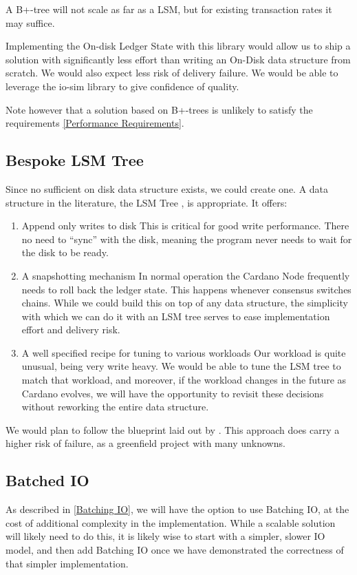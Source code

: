 \documentclass[11pt,a4paper]{article}
\begin{document}
A B+-tree will not scale as far as a LSM, but for existing transaction rates it
may suffice.

Implementing the On-disk Ledger State with this library would allow us to ship a
solution with significantly less effort than writing an On-Disk data structure
from scratch. We would also expect less risk of delivery failure. We would be
able to leverage the io-sim library to give confidence of quality.

Note however that a solution based on B+-trees is unlikely to satisfy the requirements \ref{Performance Requirements}.

\subsection{Bespoke LSM Tree}

Since no sufficient on disk data structure exists, we could create one. A data
structure in the literature, the LSM Tree \cite{monkey}, is appropriate. It offers:

\begin{enumerate}
  \item Append only writes to disk
        This is critical for good write performance. There no need to ``sync''
        with the disk, meaning the program never needs to wait for the disk to be ready.
  \item A snapshotting mechanism
        In normal operation the Cardano Node frequently needs to roll back the
        ledger state. This happens whenever consensus switches chains. While we could
        build this on top of any data structure, the simplicity with which we can do it
        with an LSM tree serves to ease implementation effort and delivery risk.
  \item A well specified recipe for tuning to various workloads
        Our workload is quite unusual, being very write heavy. We would be able
        to tune the LSM tree to match that workload, and moreover, if the workload
        changes in the future as Cardano evolves, we will have the opportunity to
        revisit these decisions without reworking the entire data structure.
\end{enumerate}

We would plan to follow the blueprint laid out by \cite{monkey}. This approach
does carry a higher risk of failure, as a greenfield project with many unknowns.

\subsection{Batched IO}
As described in \ref{Batching IO}, we will have the option to use Batching IO,
at the cost of additional complexity in the implementation. While a scalable
solution will likely need to do this, it is likely wise to start with a simpler,
slower IO model, and then add Batching IO once we have demonstrated the
correctness of that simpler implementation.
\end{document}
